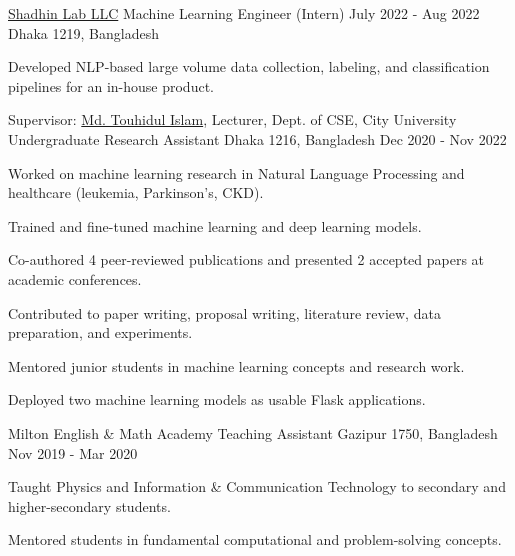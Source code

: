 \begin{cventries}

\cventry
    {\href{https://shadhinlab.com/}{Shadhin Lab LLC}} %
    {Machine Learning Engineer (Intern)} %
    {July 2022 - Aug 2022} %
    {Dhaka 1219, Bangladesh} %
    {
      \begin{cvitems}
        \item{Developed NLP-based large volume data collection, labeling, and classification pipelines for an in-house product.}
      \end{cvitems}
    }



\cventry
  {Supervisor: \href{https://www.linkedin.com/in/touhid000/}{Md. Touhidul Islam}, Lecturer, Dept. of CSE, City University} %
  {Undergraduate Research Assistant} %
  {Dhaka 1216, Bangladesh} %
  {Dec 2020 - Nov 2022} %
  {
    \begin{cvitems} %
      \item{Worked on machine learning research in Natural Language Processing and healthcare (leukemia, Parkinson's, CKD).}
      \item{Trained and fine-tuned machine learning and deep learning models.}
      \item{Co-authored 4 peer-reviewed publications and presented 2 accepted papers at academic conferences.}
      \item{Contributed to paper writing, proposal writing, literature review, data preparation, and experiments.}
      \item{Mentored junior students in machine learning concepts and research work.}
      \item{Deployed two machine learning models as usable Flask applications.}
    \end{cvitems}
  }
  

\cventry
    {Milton English \& Math Academy} %
    {Teaching Assistant} %
    {Gazipur 1750, Bangladesh} %
    {Nov 2019 - Mar 2020} %
    {
        \begin{cvitems} %
        \item {Taught Physics and Information \& Communication Technology to secondary and higher-secondary students.}
        \item{Mentored students in fundamental computational and problem-solving concepts.}
        \end{cvitems}
    }


\end{cventries}
